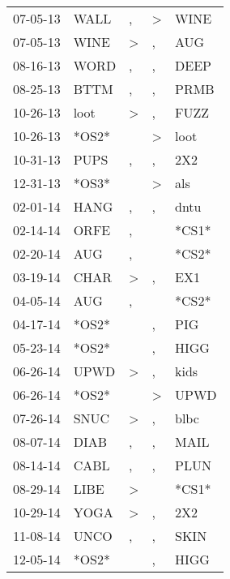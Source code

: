\begin{supertabular}{lllll}
 07-05-13 &   WALL &                , &     \textgreater &   WINE \\
 07-05-13 &   WINE &     \textgreater &                , &    AUG \\
 08-16-13 &   WORD &                , &                , &   DEEP \\
 08-25-13 &   BTTM &                , &                , &   PRMB \\
 10-26-13 &   loot &     \textgreater &                , &   FUZZ \\
 10-26-13 &  *OS2* &                  &     \textgreater &   loot \\
 10-31-13 &   PUPS &                , &                , &    2X2 \\
 12-31-13 &  *OS3* &                  &     \textgreater &    als \\
 02-01-14 &   HANG &                , &                , &   dntu \\
 02-14-14 &   ORFE &                , &                  &  *CS1* \\
 02-20-14 &    AUG &                , &                  &  *CS2* \\
 03-19-14 &   CHAR &     \textgreater &                , &    EX1 \\
 04-05-14 &    AUG &                , &                  &  *CS2* \\
 04-17-14 &  *OS2* &                  &                , &    PIG \\
 05-23-14 &  *OS2* &                  &                , &   HIGG \\
 06-26-14 &   UPWD &     \textgreater &                , &   kids \\
 06-26-14 &  *OS2* &                  &     \textgreater &   UPWD \\
 07-26-14 &   SNUC &     \textgreater &                , &   blbc \\
 08-07-14 &   DIAB &                , &                , &   MAIL \\
 08-14-14 &   CABL &                , &                , &   PLUN \\
 08-29-14 &   LIBE &     \textgreater &                  &  *CS1* \\
 10-29-14 &   YOGA &     \textgreater &                , &    2X2 \\
 11-08-14 &   UNCO &                , &                , &   SKIN \\
 12-05-14 &  *OS2* &                  &                , &   HIGG \\

\end{supertabular}
